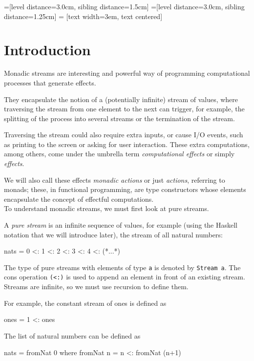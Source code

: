 =[level distance=3.0cm, sibling distance=1.5cm]
=[level distance=3.0cm, sibling distance=1.25cm]
 = [text width=3em, text centered]

\section{Introduction}

Monadic streams are interesting and powerful way of programming computational processes that generate effects. 

They encapsulate the notion of a (potentially infinite) stream of values,
where traversing the stream from one element to the next 
can trigger, for example,
the splitting of the process into several streams
or the termination of the stream.

 Traversing the stream could also require extra inputs, or cause I/O events, such as printing to the screen or asking for user interaction. These extra computations, among others, come under the umbrella term \emph{computational effects} or simply \emph{effects}. 

We will also call these effects \emph{monadic actions} or just \emph{actions}, referring to monads; these, in functional programming, are type constructors whose elements encapsulate the concept of effectful computations. \\

To understand monadic streams, we must first look at pure streams.

A \emph{pure stream} is an infinite sequence of values, for example (using the Haskell notation that we will introduce later), the stream of all natural numbers:
\begin{haskell}
  nats = 0 <: 1 <: 2 <: 3 <: 4 <: (*...*)
\end{haskell}
The type of pure streams with elements of type \verb+a+ is denoted by \verb+Stream a+. The cons operation \verb+(<:)+ is used to append an element in front of an existing stream. Streams are infinite, so we must use recursion to define them.

For example, the constant stream of ones is defined as
\begin{haskell}
  ones = 1 <: ones
\end{haskell}

The list of natural numbers can be defined as
\begin{haskell}
  nats = fromNat 0
    where fromNat n = n <: fromNat (n+1)
\end{haskell}

